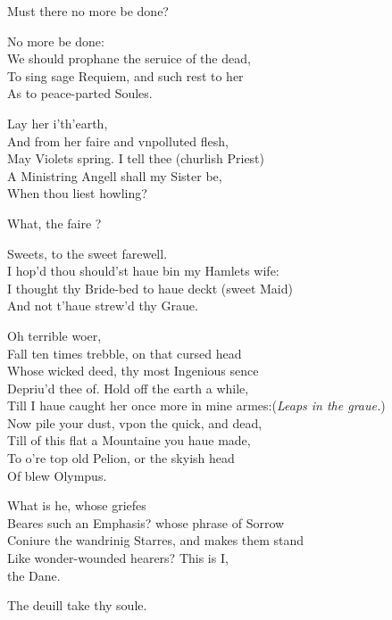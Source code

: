 \documentclass[a5paper,DIV=calc,11pt]{scrbook}
\begin{document}
\begin{drama*}
    \laerspeaks Must there no more be done?
    
     No more be done:\\
    We should prophane the seruice of the dead,\\
    To sing sage Requiem, and such rest to her\\
    As to peace-parted Soules.
    
    \laerspeaks Lay her i'th'earth,\\
    And from her faire and vnpolluted flesh,\\
    May Violets spring. I tell thee (churlish Priest)\\
    A Ministring Angell shall my Sister be,\\
    When thou liest howling?
    
    \hamspeaks What, the faire \ophe?
    
    \queenspeaks Sweets, to the sweet farewell.\\
    I hop'd thou should'st haue bin my Hamlets wife:\\
    I thought thy Bride-bed to haue deckt (sweet Maid)\\
    And not t'haue strew'd thy Graue.
    
    \laerspeaks Oh terrible woer,\\
    Fall ten times trebble, on that cursed head\\
    Whose wicked deed, thy most Ingenious sence\\
    Depriu'd thee of. Hold off the earth a while,\\
    Till I haue caught her once more in mine armes:\hfill(\textit{Leaps in the graue.})\\
    Now pile your dust, vpon the quick, and dead,\\
    Till of this flat a Mountaine you haue made,\\
    To o're top old Pelion, or the skyish head\\
    Of blew Olympus.
    
    \hamspeaks What is he, whose griefes\\
    Beares such an Emphasis? whose phrase of Sorrow\\
    Coniure the wandrinig Starres, and makes them stand\\
    Like wonder-wounded hearers? This is I,\\
    \ham the Dane.
    
    \laerspeaks The deuill take thy soule.
    

\end{drama*}
\end{document}
